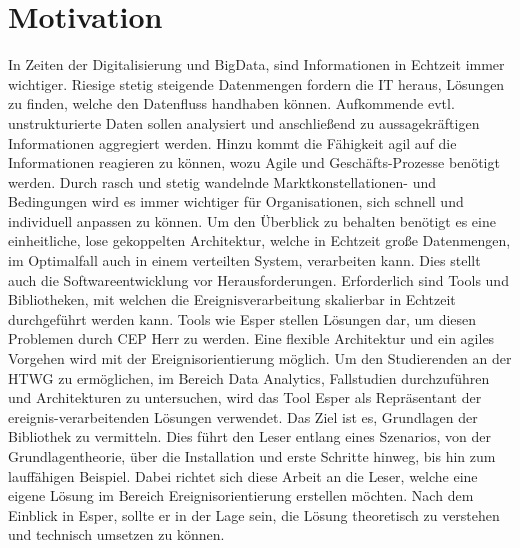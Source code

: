 \chapter{Motivation}
In Zeiten der Digitalisierung und BigData, sind Informationen in Echtzeit immer wichtiger. Riesige stetig steigende Datenmengen fordern die IT heraus, Lösungen zu finden, welche den Datenfluss handhaben können. Aufkommende evtl. unstrukturierte Daten sollen analysiert und anschließend zu aussagekräftigen Informationen aggregiert werden.
Hinzu kommt die Fähigkeit agil auf die Informationen reagieren zu können, wozu Agile und Geschäfts-Prozesse benötigt werden. 
Durch rasch und stetig wandelnde Marktkonstellationen- und Bedingungen wird es immer wichtiger für Organisationen, sich schnell und individuell anpassen zu können. 
\absatz
Um den Überblick zu behalten benötigt es eine einheitliche, lose gekoppelten Architektur, welche in Echtzeit große Datenmengen, im Optimalfall auch in einem verteilten System, verarbeiten kann. Dies stellt auch die Softwareentwicklung vor Herausforderungen.
Erforderlich sind Tools und Bibliotheken, mit welchen die Ereignisverarbeitung skalierbar in Echtzeit durchgeführt werden kann. Tools wie Esper stellen Lösungen dar, um diesen Problemen durch \ac{CEP} Herr zu werden. Eine flexible Architektur und ein agiles Vorgehen wird mit der Ereignisorientierung möglich.
\absatz
Um den Studierenden an der HTWG zu ermöglichen, im Bereich Data Analytics, Fallstudien durchzuführen und Architekturen zu untersuchen, wird das Tool Esper als Repräsentant der ereignis-verarbeitenden Lösungen verwendet.
Das Ziel ist es, Grundlagen der Bibliothek zu vermitteln. Dies führt den Leser entlang eines Szenarios, von der Grundlagentheorie, über die Installation und erste Schritte hinweg, bis hin zum lauffähigen Beispiel.
Dabei richtet sich diese Arbeit an die Leser, welche eine eigene Lösung im Bereich Ereignisorientierung erstellen möchten.
Nach dem Einblick in Esper, sollte er in der Lage sein, die Lösung theoretisch zu verstehen und technisch umsetzen zu können.